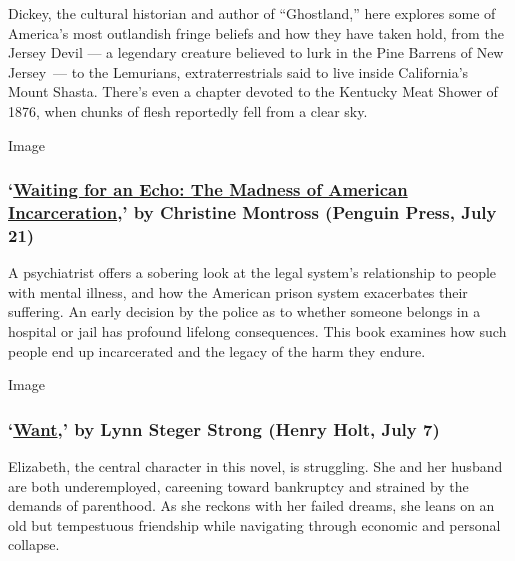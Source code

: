 Dickey, the cultural historian and author of ``Ghostland,'' here
explores some of America's most outlandish fringe beliefs and how they
have taken hold, from the Jersey Devil --- a legendary creature believed
to lurk in the Pine Barrens of New Jersey~--- to the Lemurians,
extraterrestrials said to live inside California's Mount Shasta. There's
even a chapter devoted to the Kentucky Meat Shower of 1876, when chunks
of flesh reportedly fell from a clear sky.

Image

\hypertarget{waiting-for-an-echo-the-madness-of-american-incarceration-by-christine-montross-penguin-press-july-21}{%
\subsubsection{\texorpdfstring{`\href{https://www.penguinrandomhouse.com/books/315949/waiting-for-an-echo-by-christine-montross-md/9781594205972}{Waiting
for an Echo: The Madness of American Incarceration},' by Christine
Montross (Penguin Press, July
21)}{`Waiting for an Echo: The Madness of American Incarceration,' by Christine Montross (Penguin Press, July 21)}}\label{waiting-for-an-echo-the-madness-of-american-incarceration-by-christine-montross-penguin-press-july-21}}

A psychiatrist offers a sobering look at the legal system's relationship
to people with mental illness, and how the American prison system
exacerbates their suffering. An early decision by the police as to
whether someone belongs in a hospital or jail has profound lifelong
consequences. This book examines how such people end up incarcerated and
the legacy of the harm they endure.

Image

\hypertarget{want-by-lynn-steger-strong-henry-holt-july-7}{%
\subsubsection{\texorpdfstring{`\href{https://us.macmillan.com/books/9781250247537}{Want},'
by Lynn Steger Strong (Henry Holt, July
7)}{`Want,' by Lynn Steger Strong (Henry Holt, July 7)}}\label{want-by-lynn-steger-strong-henry-holt-july-7}}

Elizabeth, the central character in this novel, is struggling. She and
her husband are both underemployed, careening toward bankruptcy and
strained by the demands of parenthood. As she reckons with her failed
dreams, she leans on an old but tempestuous friendship while navigating
through economic and personal collapse.

